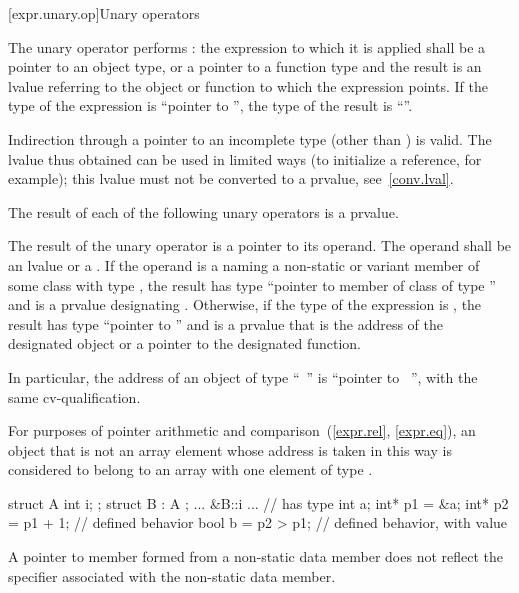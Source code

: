 [expr.unary.op]{Unary operators}

\pnum
{}%
%
The unary \tcode{*} operator performs :
%
the expression to which it is applied shall be a pointer to an object
type, or a pointer to a function type and the result is an lvalue
referring to the object or function to which the expression points. If
the type of the expression is ``pointer to '', the type of the
result is ``''.
\begin{note}
%
Indirection through a pointer to an incomplete type (other than
 ) is valid. The lvalue thus obtained can be
used in limited ways (to initialize a reference, for example); this
lvalue must not be converted to a prvalue, see~\ref{conv.lval}.
\end{note}

\pnum
The result of each of the following unary operators is a prvalue.

\pnum
{}%
%
The result of the unary \tcode{\&} operator is a pointer to its operand.
The operand shall be an lvalue or a .
If the operand is a  naming a non-static or variant member 
of some class  with type , the result has type ``pointer to member
of class  of type '' and is a prvalue designating .
Otherwise, if the type of the expression is , the result has type ``pointer to
'' and is a prvalue that is the address of the designated object
or a pointer to the designated function. \begin{note} In particular, the address of an
object of type ``\cv{}~'' is ``pointer to \cv{}~'', with the same
cv-qualification. \end{note}
For purposes of pointer arithmetic and
comparison~(\ref{expr.rel}, \ref{expr.eq}),
an object that is not an array element whose
address is taken in this way is considered to belong to an array with one
element of type .
\begin{example}

\begin{codeblock}
struct A { int i; };
struct B : A { };
... &B::i ...       // has type 
int a;
int* p1 = &a;
int* p2 = p1 + 1;   // defined behavior
bool b = p2 > p1;   // defined behavior, with value 
\end{codeblock}
\end{example}
\begin{note}
A pointer to member formed from a  non-static data
member does not reflect the  specifier
associated with the non-static data member.
\end{note}

